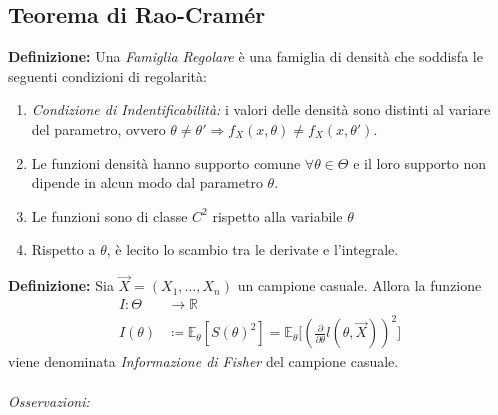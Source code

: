 \subsection{Teorema di Rao-Cramér}
\textbf{Definizione:} Una \textit{Famiglia Regolare} è una famiglia di densità che soddisfa le seguenti condizioni di regolarità:
\begin{enumerate}[noitemsep]
\item \textit{Condizione di Indentificabilità:} i valori delle densità sono distinti al variare del parametro, ovvero $\theta\neq \theta' \Longrightarrow f_X(x,\theta)\neq f_X(x,\theta')$.
\item Le funzioni densità hanno supporto comune $\forall \theta\in\Theta$ e il loro supporto non dipende in alcun modo dal parametro $\theta$.
\item Le funzioni sono di classe $C^2$ rispetto alla variabile $\theta$
\item Rispetto a $\theta$, è lecito lo scambio tra le derivate e l'integrale.
\end{enumerate}
\textbf{Definizione:} Sia $\vec{X}=(X_1,\ldots, X_n)$ un campione casuale. Allora la funzione
\begin{align*}
I:\Theta &\longrightarrow  \mathbb{R} \\
I(\theta)  &\coloneqq   \mathbb{E}_\theta[S(\theta)^2]=\mathbb{E}_\theta\Bigg[\left(\frac{\partial}{\partial \theta}l(\theta,\vec{X})\right)^2\Bigg]
\end{align*}
viene denominata \textit{Informazione di Fisher} del campione casuale.
\\
\\
\textit{Osservazioni:}

